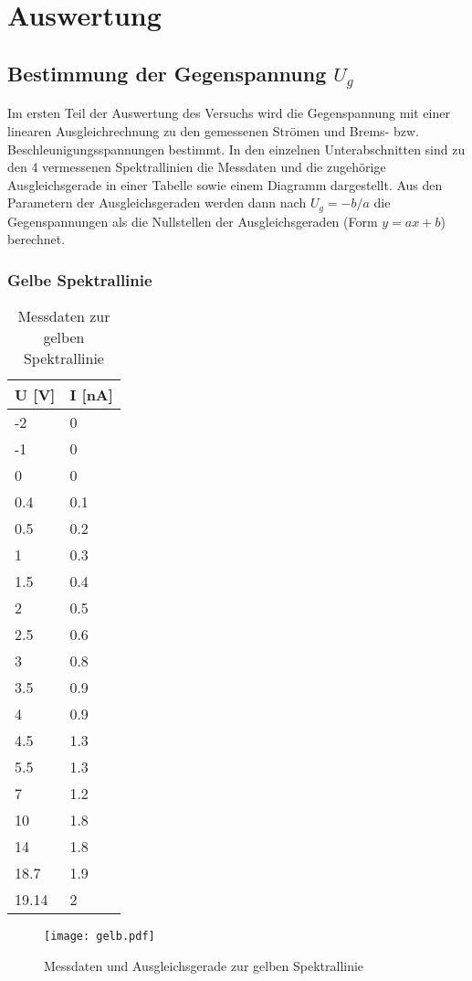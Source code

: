 \section{Auswertung}
\label{sec:Auswertung}
\subsection{Bestimmung der Gegenspannung $U_g$}
Im ersten Teil der Auswertung des Versuchs wird die Gegenspannung mit einer linearen Ausgleichrechnung zu den gemessenen Strömen und Brems- bzw. Beschleunigungsspannungen bestimmt. In den einzelnen Unterabschnitten sind zu den 4 vermessenen Spektrallinien die Messdaten und die zugehörige Ausgleichsgerade in einer Tabelle sowie einem Diagramm dargestellt. Aus den Parametern der Ausgleichsgeraden werden dann nach $U_g=-b/a$ die Gegenspannungen als die Nullstellen der Ausgleichsgeraden (Form $y=ax+b$) berechnet.
\subsubsection{Gelbe Spektrallinie}
\begin{table}[H]
  \centering
  \caption{Messdaten zur gelben Spektrallinie}
  \label{tab:gelb}
  \begin{tabular}{ll}
  \toprule
  U {[}V{]} & I {[}nA{]} \\
  \midrule
  -2 & 0 \\
  -1 & 0 \\
  0 & 0 \\
  0.4 & 0.1 \\
  0.5 & 0.2 \\
  1 & 0.3 \\
  1.5 & 0.4 \\
  2 & 0.5 \\
  2.5 & 0.6 \\
  3 & 0.8 \\
  3.5 & 0.9 \\
  4 & 0.9 \\
  4.5 & 1.3 \\
  5.5 & 1.3 \\
  7 & 1.2 \\
  10 & 1.8 \\
  14 & 1.8 \\
  18.7 & 1.9 \\
  19.14 & 2\\\bottomrule
  \end{tabular}
  \end{table}

  \begin{figure}[H]
    \centering
    \texttt{[image: gelb.pdf]}
    \caption{Messdaten und Ausgleichsgerade zur gelben Spektrallinie}
    \label{fig:gelb}
  \end{figure}

